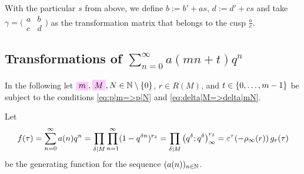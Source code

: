 \documentclass{article}
\begin{document}
With the particular $s$ from above, we define $b:=b'+as$, $d:=d'+cs$
and take
%
$\gamma = \bigl(
\begin{smallmatrix}
  a & b\\
  c & d
\end{smallmatrix}
\bigr)$ as the transformation matrix that belongs to the cusp
$\frac{a}{c}$.




\subsection{Transformations of $\sum_{n=0}^\infty a(mn+t) q^n$}
\label{sec:p_r-m-t}

In the following let $\defineNotation[m]{m}, \defineNotation[M]{M}, N
\in \setN \setminus \Set{0}$, $r \in
R(M)$, and
$t\in\left\{0,\ldots,m-1\right\}$ be subject to the conditions
\eqref{eq:p|m=>p|N} and \eqref{eq:delta|M=>delta|mN}.


Let
\begin{gather*}
  f(\tau)
  =
  \sum_{n=0}^\infty a(n) q^n
  =
  \prod_{\delta \mid M}\prod_{n=1}^\infty(1-q^{\delta n})^{r_\delta}
  =
  \prod_{\delta \mid M}\left( {q}^{\delta};{q}^{\delta} \right)_{\infty}^{r_\delta}
  =
  \varepsilon^\tau\!\left(-\rho_\infty(r)\right) g_r(\tau)
\end{gather*}
be the generating function for the sequence $(a(n))_{n\in\mathbb{N}}$.
\end{document}
